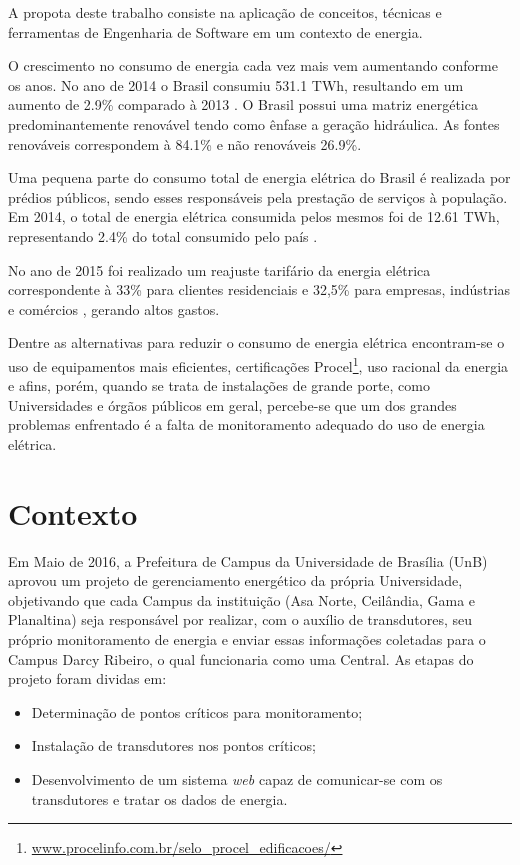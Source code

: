 A propota deste trabalho consiste na aplicação de conceitos, técnicas e ferramentas de Engenharia de Software em um contexto de energia.

O crescimento no consumo de energia cada vez mais vem aumentando conforme os anos. No
ano de 2014 o Brasil consumiu 531.1 TWh, resultando em um aumento de 2.9\% comparado à 2013 \cite{balanco_energetico}. O Brasil possui uma matriz energética predominantemente renovável tendo como ênfase a geração hidráulica. As fontes renováveis correspondem à 84.1\% e não renováveis 26.9\%.

Uma pequena parte do consumo total de energia elétrica do Brasil é realizada por prédios públicos, sendo
esses responsáveis pela prestação de serviços à população. Em 2014, o total de energia elétrica consumida
pelos mesmos foi de 12.61 TWh, representando 2.4\% do total consumido pelo país \cite{balanco_energetico}.

No ano de 2015 foi realizado um reajuste tarifário da energia elétrica correspondente à 33\% para clientes residenciais e 32,5\% para empresas, indústrias e comércios \cite{aumento_energia}, gerando altos gastos.

Dentre as alternativas para reduzir o consumo de energia elétrica encontram-se o uso de equipamentos mais eficientes, certificações Procel\footnote{\url{www.procelinfo.com.br/selo_procel_edificacoes/}}, uso racional da energia e afins, porém, quando se trata de instalações de grande porte, como Universidades e órgãos públicos em geral, percebe-se que um dos grandes problemas enfrentado é a falta de monitoramento adequado do uso de energia elétrica.

\section{Contexto}
Em Maio de 2016, a Prefeitura de Campus da Universidade de Brasília (UnB) aprovou um projeto de gerenciamento energético da própria Universidade, objetivando que cada Campus da instituição (Asa Norte, Ceilândia, Gama e Planaltina) seja responsável por realizar, com o auxílio de transdutores, seu próprio monitoramento de energia e enviar essas informações coletadas para o Campus Darcy Ribeiro, o qual funcionaria como uma Central. As etapas do projeto foram dividas em:
\begin{itemize}
    \item Determinação de pontos críticos para monitoramento;
    \item Instalação de transdutores nos pontos críticos;
    \item Desenvolvimento de um sistema \textit{web} capaz de comunicar-se com os transdutores e tratar os dados de energia.
\end{itemize}

